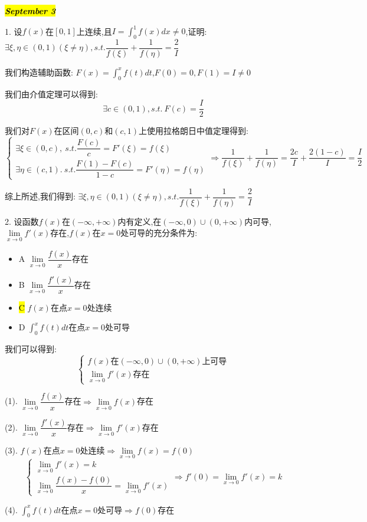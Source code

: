 \hl{\textbf{\textit{September 3}}}

1. 设$f(x)$在$[0,1]$上连续,且$I=\int_{0}^{1}f(x)dx\neq 0$,证明:  $\exists \xi,\eta\in(0,1)(\xi\neq \eta),s.t. \dfrac{1}{f(\xi)}+\dfrac{1}{f(\eta)}=\dfrac{2}{I}$
\begin{solution}

	我们构造辅助函数:  $F(x)=\int_{0}^{x}f(t)dt$,$F(0)=0,F(1)=I\neq 0$
	
	我们由介值定理可以得到:  
	$$\exists c\in(0,1),s.t. \ F(c)=\dfrac{I}{2}$$
	
	我们对$F(x)$在区间$(0,c)$和$(c,1)$上使用拉格朗日中值定理得到:  
	$$\left\lbrace
	\begin{array}{l}
		\exists\xi\in(0,c),\ s.t. \dfrac{F(c)}{c}=F'(\xi)=f(\xi)\\
		\exists\eta\in(c,1).\ s.t. \dfrac{F(1)-F(c)}{1-c}=F'(\eta)=f(\eta)
	\end{array}
	\right. \Rightarrow \dfrac{1}{f(\xi)}+\dfrac{1}{f(\eta)}=\dfrac{2c}{I}+\dfrac{2(1-c)}{I}=\dfrac{I}{2}$$
	
	综上所述,我们得到:  $\exists \xi,\eta\in(0,1)(\xi\neq \eta),s.t. \dfrac{1}{f(\xi)}+\dfrac{1}{f(\eta)}=\dfrac{2}{I}$
\end{solution}

2. 设函数$f(x)$在$(-\infty,+\infty)$内有定义,在$(-\infty,0)\cup(0,+\infty)$内可导,$\lim\limits_{x\rightarrow 0}f'(x)$存在,$f(x)$在$x=0$处可导的充分条件为:  
\begin{itemize}
	\item A $\lim\limits_{x\rightarrow 0}\dfrac{f(x)}{x}$存在
	\item B $\lim\limits_{x\rightarrow 0}\dfrac{f'(x)}{x}$存在
	\item \hl{C} $f(x)$在点$x=0$处连续
	\item D $\int_{0}^{x}f(t)dt$在点$x=0$处可导
\end{itemize}
\begin{solution}

	我们可以得到:  
	$$\left\lbrace
	\begin{array}{l}
		f(x)\text{在}(-\infty,0)\cup(0,+\infty)\text{上可导}\\
		\lim\limits_{x\rightarrow 0}f'(x)\text{存在}
	\end{array}
	\right. $$
	
	(1). $\lim\limits_{x\rightarrow 0}\dfrac{f(x)}{x}$存在$\Rightarrow \lim\limits_{x\rightarrow 0}f(x)$存在
	
	(2). $\lim\limits_{x\rightarrow 0}\dfrac{f'(x)}{x}$存在$\Rightarrow \lim\limits_{x\rightarrow 0}f'(x)$存在
	
	(3). $f(x)$在点$x=0$处连续$\Rightarrow \lim\limits_{x\rightarrow 0}f(x)=f(0)$
	$$\left\lbrace
	\begin{array}{l}
		\lim\limits_{x\rightarrow 0}f'(x)=k\\
		\lim\limits_{x\rightarrow 0}\dfrac{f(x)-f(0)}{x}=\lim\limits_{x\rightarrow 0}f'(x)
	\end{array}
	\right. \Rightarrow f'(0)=\lim\limits_{x\rightarrow 0}f'(x)=k$$
	
	(4). $\int_{0}^{x}f(t)dt$在点$x=0$处可导$\Rightarrow f(0)$存在
\end{solution}

